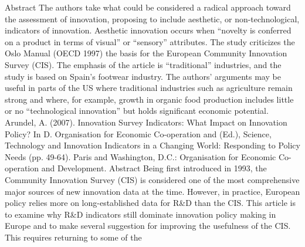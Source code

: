 \documentclass[a4paper,11pt]{article}
\begin{document}
Abstract
The authors take what could be considered a radical approach toward the assessment of innovation, proposing to include aesthetic, or non-technological, indicators of innovation. Aesthetic innovation occurs when “novelty is conferred on a product in terms of visual” or “sensory” attributes. The study criticizes the Oslo Manual (OECD 1997) the basis for the European Community Innovation Survey (CIS). The emphasis of the article is “traditional” industries, and the study is based on Spain’s footwear industry. The authors’ arguments may be useful in parts of the US where traditional industries such as agriculture remain strong and where, for example, growth in organic food production includes little or no “technological innovation” but holds significant economic potential.
Arundel, A. (2007). Innovation Survey Indicators: What Impact on Innovation Policy? In
D.	Organisation for Economic Co-operation and (Ed.), Science, Technology and Innovation Indicators in a Changing World: Responding to Policy Needs (pp. 49-64). Paris and Washington, D.C.: Organisation for Economic Co-operation and Development.
Abstract
Being first introduced in 1993, the Community Innovation Survey (CIS) is considered one of the most comprehensive major sources of new innovation data at the time. However, in practice, European policy relies more on long-established data for R&D than the CIS. This article is to examine why R&D indicators still dominate innovation policy making in Europe and to make several suggestion for improving the usefulness of the CIS. This requires returning to some of the
 
\end{document}
